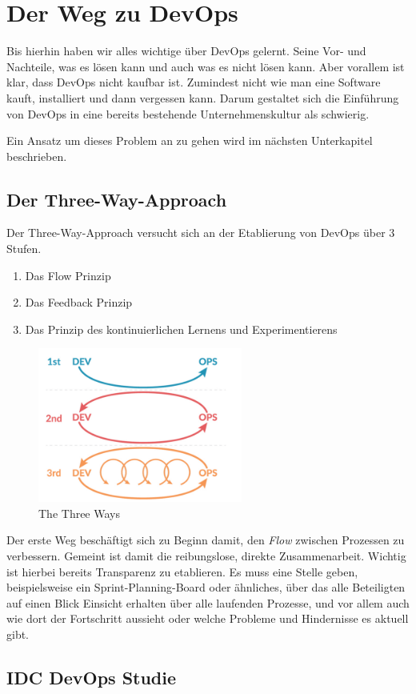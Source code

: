 \chapter{Der Weg zu DevOps} %

Bis hierhin haben wir alles wichtige über DevOps gelernt. Seine Vor- und Nachteile, was es lösen kann und auch was es nicht lösen kann. Aber vorallem ist klar, dass DevOps nicht kaufbar ist. Zumindest nicht wie man eine Software kauft, installiert und dann vergessen kann. Darum gestaltet sich die Einführung von \ac{DevOps} in eine bereits bestehende Unternehmenskultur als schwierig.

Ein Ansatz um dieses Problem an zu gehen wird im nächsten Unterkapitel beschrieben.


\section{Der Three-Way-Approach}

Der Three-Way-Approach versucht sich an der Etablierung von \ac{DevOps} über 3 Stufen. \cite{nine:2018}

\begin{enumerate}
\item Das Flow Prinzip
\item Das Feedback Prinzip
\item Das Prinzip des kontinuierlichen Lernens und Experimentierens
\end{enumerate}

\begin{figure}[h]
\centering
\includegraphics[width=0.6\textwidth]{Graphics/three_ways}
\caption{The Three Ways \cite{curra:2020}}
\end{figure}

Der erste Weg beschäftigt sich zu Beginn damit, den \textit{Flow} zwischen Prozessen zu verbessern. Gemeint ist damit die \glqq reibungslose, direkte Zusammenarbeit\grqq \cite{nine:2018}. Wichtig ist hierbei bereits Transparenz zu etablieren. Es muss eine Stelle geben, beispielsweise ein Sprint-Planning-Board oder ähnliches, über das alle Beteiligten auf einen Blick Einsicht erhalten über alle laufenden Prozesse, und vor allem auch wie dort der Fortschritt aussieht oder welche Probleme und Hindernisse es aktuell gibt.

\section{IDC DevOps Studie}
